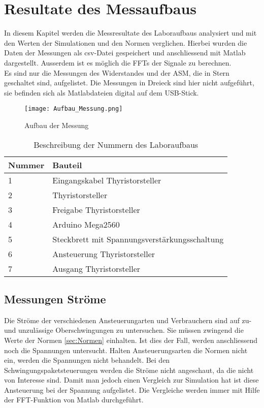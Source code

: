 \section{Resultate des Messaufbaus}
In diesem Kapitel werden die Messresultate des Laboraufbaus analysiert und mit den Werten der Simulationen und den Normen verglichen. Hierbei wurden die Daten der Messungen als csv-Datei gespeichert und anschliessend mit Matlab dargestellt. Ausserdem ist es möglich die FFTs der Signale zu berechnen.\\
Es sind nur die Messungen des Widerstandes und der ASM, die in Stern geschaltet sind, aufgelistet. Die Messungen in Dreieck sind hier nicht aufgeführt, sie  befinden sich als Matlabdateien digital auf dem USB-Stick. 

\begin{figure}[ht!]
	\centering
	\texttt{[image: Aufbau\_Messung.png]}	
	\caption{Aufbau der Messung}\label{fig:Aufbau Messung}
\end{figure}

\begin{table}[ht!]
	\centering
	\begin{tabular}{|l|l|}
		\hline
		Nummer & Bauteil                                       \\ \hline
		1      & Eingangskabel Thyristorsteller                \\ \hline
		2      & Thyristorsteller                              \\ \hline
		3      & Freigabe Thyristorsteller                     \\ \hline
		4      & Arduino Mega2560                              \\ \hline
		5      & Steckbrett mit Spannungsverstärkungsschaltung \\ \hline
		6      & Ansteuerung Thyristorsteller                  \\ \hline
		7      & Ausgang Thyristorsteller                      \\ \hline
	\end{tabular}
	\caption{Beschreibung der Nummern des Laboraufbaus}\label{tab:Nummern_Laboraufbau}
\end{table}





\newpage
\subsection{Messungen Ströme}
Die Ströme der verschiedenen Ansteuerungarten und Verbrauchern sind auf zu- und unzulässige Oberschwingungen zu untersuchen. Sie müssen zwingend die Werte der Normen \ref{sec:Normen} einhalten. Ist dies der Fall, werden anschliessend noch die Spannungen untersucht. Halten Ansteuerungsarten die Normen nicht ein, werden die Spannungen nicht behandelt. Bei den Schwingungspaketsteuerungen werden die Ströme nicht angeschaut, da die nicht von Interesse sind. Damit man jedoch einen Vergleich zur Simulation hat ist diese Ansteuerung bei der Spannung aufgelistet. Die Vergleiche werden immer mit Hilfe der FFT-Funktion von Matlab durchgeführt. 

